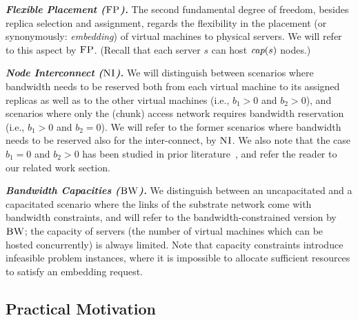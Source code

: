 \documentclass[9pt]{sigcomm-alternate}
\newcommand{\maciek}[1]{\textcolor{brown}{maciek: #1}}
\newcommand{\capa}{\emph{cap}}
\newcommand{\CC}{\textsc{NI}}
\newcommand{\FP}{\textsc{FP}}
\newcommand{\BW}{\textsc{BW}}
\newcommand{\CostTrans}{\ensuremath{b_1}}
\newcommand{\CostCom}{\ensuremath{b_2}}
\begin{document}
\textbf{\emph{Flexible Placement ($\FP$).}} The second fundamental degree of freedom, besides replica selection and assignment,
regards the flexibility in the placement (or synonymously: \emph{embedding}) of virtual machines to physical servers.
We will refer to this aspect by $\FP$. (Recall that each server $s$ can host $\capa(s)$ nodes.)


\textbf{\emph{Node Interconnect ($\CC$).}} We will distinguish between scenarios where bandwidth needs to be reserved
both from each virtual machine to its assigned replicas as well as to the other virtual machines
(i.e., $\CostTrans>0$ and $\CostCom>0$), and
 scenarios where only the (chunk) access network requires bandwidth reservation (i.e., $\CostTrans>0$ and $\CostCom=0$).
 We will refer to the former scenarios
where bandwidth needs to be reserved also for the inter-connect, by $\CC$.
We also note that the case $\CostTrans=0$ and $\CostCom>0$ has been studied in prior literature~\cite{oktopus,talk-about,proteus}, 
and refer the reader to our related work section.


\textbf{\emph{Bandwidth Capacities ($\BW$).}}
We distinguish between an uncapacitated and a capacitated scenario where the links
of the substrate network come with bandwidth
constraints, and will refer to the bandwidth-constrained version by $\BW$; the capacity of servers
(the number of virtual machines which can be hosted concurrently) is always limited.
Note that capacity constraints introduce infeasible problem instances, where it is impossible to
allocate sufficient resources to satisfy an embedding request.


\subsection{Practical Motivation}\label{ssec:practice}
\end{document}
